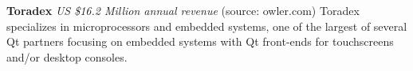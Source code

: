 \begin{frame}{}
{\begin{minipage}{\textwidth}
{\begin{enumerate}
\dmitem \textbf{Toradex} 
\textit{US \$16.2 Million annual revenue} (source: owler.com)
Toradex specializes in microprocessors 
and embedded systems, one of the largest 
of several Qt partners focusing on 
embedded systems with Qt front-ends 
for touchscreens and/or desktop consoles.


\end{enumerate}}
\end{minipage}

}

\end{frame}
